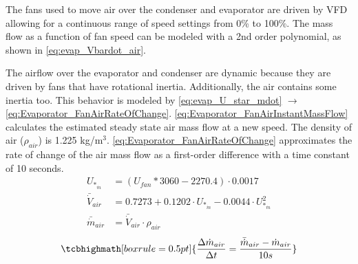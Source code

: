 \medskip
The fans used to move air over the condenser and evaporator are driven by VFD allowing for a continuous range of speed settings from 0\% to 100\%. The mass flow as a function of fan speed can be modeled with a 2nd order polynomial, as shown in \cref{eq:evap_Vbardot_air}.

The airflow over the evaporator and condenser are dynamic because they are driven by fans that have rotational inertia. Additionally, the air contains some inertia too. This behavior is modeled by \cref{eq:evap_U_star_mdot} $\rightarrow$ \cref{eq:Evaporator_FanAirRateOfChange}. \cref{eq:Evaporator_FanAirInstantMassFlow} calculates the estimated steady state air mass flow at a new speed. The density of air ($\rho_{air}$) is 1.225 \si{kg}/\si{m}$^3$. \cref{eq:Evaporator_FanAirRateOfChange} approximates the rate of change of the air mass flow as a first-order difference with a time constant of 10 seconds.
\begin{align}
	U_{*_{\dot{m}}} & = (U_{fan}*3060 - 2270.4)\cdot 0.0017 \label{eq:evap_U_star_mdot}\\
	\bar{\dot{V}}_{air} & = 0.7273 + 0.1202 \cdot 	U_{*_{\dot{m}}}  -0.0044 \cdot 	U_{*_{\dot{m}}}^2	\label{eq:evap_Vbardot_air} \\
	\bar{\dot{m}}_{air} & = \bar{\dot{V}}_{air} \cdot \rho_{air}	\label{eq:Evaporator_FanAirInstantMassFlow}
\end{align}
\begin{equation}
	\tcbhighmath[boxrule = 0.5pt]{ 	\frac{\Delta \dot{m}_{air}}{\Delta t} = \frac{\bar{\dot{m}}_{air}  - \dot{m}_{air}}{10s}  }  \label{eq:Evaporator_FanAirRateOfChange}
\end{equation}

